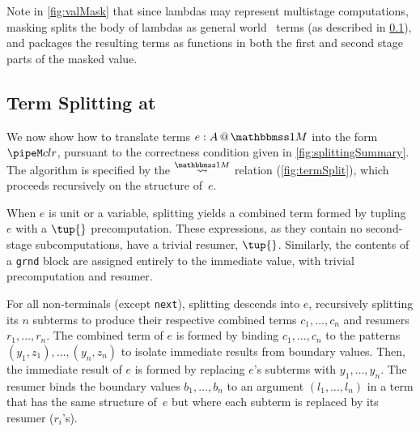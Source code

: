 \begin{abstrsyn}
Note in \ref{fig:valMask} that since lambdas may represent multistage
computations, masking splits the body of lambdas as general world
\bbonem\ terms (as described in \ref{sec:split-one}), and packages the
resulting terms as functions in both the first and second stage parts
of the masked value.



\subsection{Term Splitting at \bbonem}
\label{sec:split-one}

We now show how to translate terms $\colmix e A$ into the form $\pipeM c l r$,
pursuant to the correctness condition given in \ref{fig:splittingSummary}.
The algorithm is specified by the $\splitonesym$ relation (\cref{fig:termSplit}), 
which proceeds recursively on the structure of~$e$.

When $e$ is unit or a variable,
splitting yields a combined term formed by tupling $e$ with a $\tup{}$ precomputation.
These expressions, as they contain no second-stage subcomputations, have a trivial resumer, $\tup{}$.
Similarly, the contents of a \texttt{grnd} block are assigned entirely to the immediate value,
with trivial precomputation and resumer.

For all non-terminals (except \texttt{next}),
splitting descends into $e$, recursively splitting its $n$ subterms
to produce their respective combined terms $c_1,\ldots,c_n$ and resumers $r_1, \ldots, r_n$.
The combined term of $e$ is formed by binding $c_1,\ldots,c_n$
to the patterns $(y_1,z_1),\ldots,(y_n,z_n)$
to isolate immediate results from boundary values. Then,
the immediate result of $e$ is formed by replacing $e$'s subterms with $y_1,\ldots,y_n$.
The resumer binds the boundary values $b_1,\ldots,b_n$ to an
argument $(l_1,\ldots,l_n)$ in a term that has the same structure
of~$e$ but where each subterm is replaced by its resumer ($r_i$'s).


\end{abstrsyn}
